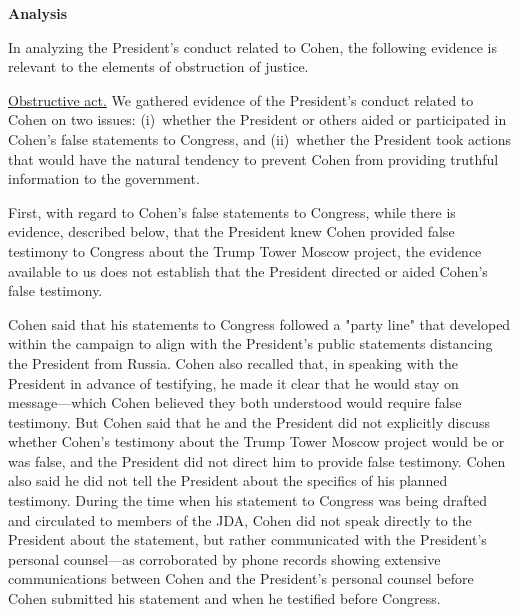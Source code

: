 {\begin{center}
\textbf{Analysis}
\end{center}

In analyzing the President's conduct related to Cohen, the following evidence is relevant to the elements of obstruction of justice.

\underline{Obstructive act.}
We gathered evidence of the President's conduct related to Cohen on two issues:
(i)~whether the President or others aided or participated in Cohen's false statements to Congress, and
(ii)~whether the President took actions that would have the natural tendency to prevent Cohen from providing truthful information to the government.

First, with regard to Cohen's false statements to Congress, while there is evidence, described below, that the President knew Cohen provided false testimony to Congress about the Trump Tower Moscow project, the evidence available to us does not establish that the President directed or aided Cohen's false testimony.

Cohen said that his statements to Congress followed a "party line" that developed within the campaign to align with the President's public statements distancing the President from Russia.
Cohen also recalled that, in speaking with the President in advance of testifying, he made it clear that he would stay on message---which Cohen believed they both understood would require false testimony.
But Cohen said that he and the President did not explicitly discuss whether Cohen's testimony about the Trump Tower Moscow project would be or was false, and the President did not direct him to provide false testimony.
Cohen also said he did not tell the President about the specifics of his planned testimony.
During the time when his statement to Congress was being drafted and circulated to members of the JDA, Cohen did not speak directly to the President about the statement, but rather communicated with the President's personal counsel---as corroborated by phone records showing extensive communications between Cohen and the President's personal counsel before Cohen submitted his statement and when he testified before Congress.

}
